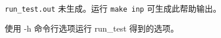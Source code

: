 \begin{figure}
{\scriptsize
{}
  {}
  {\noindent\texttt{run\_test.out} 未生成。运行 \texttt{make inp} 可生成此帮助输出。}
}
\caption{使用 {\file -h} 命令行选项运行 {\file run\_test} 得到的选项。} \label{fig:runtest}
\end{figure}
